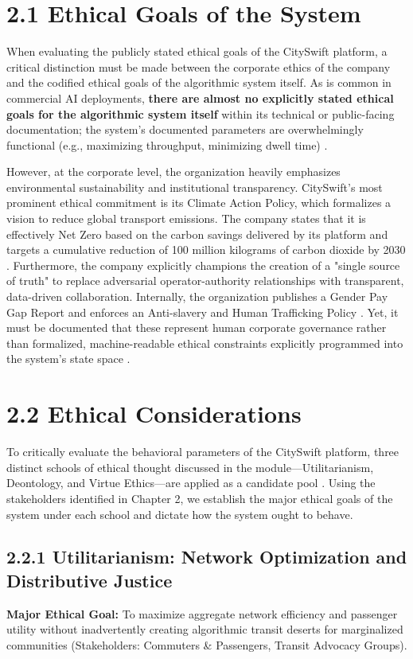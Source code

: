 \documentclass[]
{UCD_CS_41820_Report}
\begin{document}
\section*{2.1 Ethical Goals of the System}
When evaluating the publicly stated ethical goals of the CitySwift platform, a critical distinction must be made between the corporate ethics of the company and the codified ethical goals of the algorithmic system itself. As is common in commercial AI deployments, \textbf{there are almost no explicitly stated ethical goals for the algorithmic system itself} within its technical or public-facing documentation; the system's documented parameters are overwhelmingly functional (e.g., maximizing throughput, minimizing dwell time) \cite{cityswift_gov_uk}.

However, at the corporate level, the organization heavily emphasizes environmental sustainability and institutional transparency. CitySwift's most prominent ethical commitment is its Climate Action Policy, which formalizes a vision to reduce global transport emissions. The company states that it is effectively Net Zero based on the carbon savings delivered by its platform and targets a cumulative reduction of 100 million kilograms of carbon dioxide by 2030 \cite{cityswift_esg}. Furthermore, the company explicitly champions the creation of a "single source of truth" to replace adversarial operator-authority relationships with transparent, data-driven collaboration. Internally, the organization publishes a Gender Pay Gap Report and enforces an Anti-slavery and Human Trafficking Policy \cite{cityswift_esg}. Yet, it must be documented that these represent human corporate governance rather than formalized, machine-readable ethical constraints explicitly programmed into the system's state space \cite{intro_machine_ethics}.

\section*{2.2 Ethical Considerations}
To critically evaluate the behavioral parameters of the CitySwift platform, three distinct schools of ethical thought discussed in the module—Utilitarianism, Deontology, and Virtue Ethics—are applied as a candidate pool \cite{intro_machine_ethics}. Using the stakeholders identified in Chapter 2, we establish the major ethical goals of the system under each school and dictate how the system ought to behave.

\subsection*{2.2.1 Utilitarianism: Network Optimization and Distributive Justice}
\textbf{Major Ethical Goal:} To maximize aggregate network efficiency and passenger utility without inadvertently creating algorithmic transit deserts for marginalized communities (Stakeholders: Commuters \& Passengers, Transit Advocacy Groups).
\end{document}
